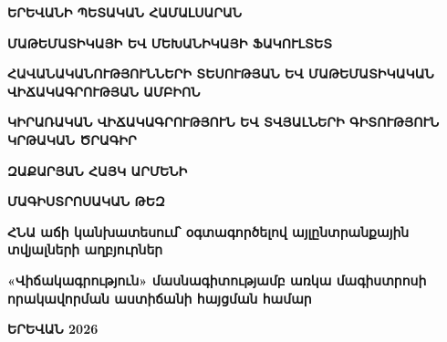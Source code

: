\documentclass[12pt,a4paper]{report}
\begin{document}
        \hypersetup{pageanchor=false}

        \begin{titlepage}
        \begin{center}
        {\armenianfrontfont\bfseries\Large \MakeUppercase{ԵՐԵՎԱՆԻ ՊԵՏԱԿԱՆ ՀԱՄԱԼՍԱՐԱՆ}\par}
        \vspace{0.6cm}
        {\armenianfrontfont\bfseries\Large \MakeUppercase{ՄԱԹԵՄԱՏԻԿԱՅԻ ԵՎ ՄԵԽԱՆԻԿԱՅԻ ՖԱԿՈՒԼՏԵՏ}\par}
        \vspace{1.4cm}
        {\armenianfrontfont\bfseries\Large ՀԱՎԱՆԱԿԱՆՈՒԹՅՈՒՆՆԵՐԻ ՏԵՍՈՒԹՅԱՆ ԵՎ ՄԱԹԵՄԱՏԻԿԱԿԱՆ ՎԻՃԱԿԱԳՐՈՒԹՅԱՆ ԱՄԲԻՈՆ\par}
        \vspace{1.8cm}
        {\armenianfrontfont\bfseries\Large \MakeUppercase{ԿԻՐԱՌԱԿԱՆ ՎԻՃԱԿԱԳՐՈՒԹՅՈՒՆ ԵՎ ՏՎՅԱԼՆԵՐԻ ԳԻՏՈՒԹՅՈՒՆ ԿՐԹԱԿԱՆ ԾՐԱԳԻՐ}\par}
        \vspace{2.1cm}
        {\armenianfrontfont\bfseries\Large ԶԱՔԱՐՅԱՆ ՀԱՅԿ ԱՐՄԵՆԻ\par}
        \vspace{1.5cm}
        {\armenianfrontfont\bfseries\LARGE ՄԱԳԻՍՏՐՈՍԱԿԱՆ ԹԵԶ\par}
        \vspace{1.5cm}
        {\armenianfrontfont\bfseries\Large ՀՆԱ աճի կանխատեսում՝ օգտագործելով այլընտրանքային տվյալների աղբյուրներ\par}
        \vspace{1.4cm}
        {\armenianfrontfont\bfseries\large «Վիճակագրություն» մասնագիտությամբ առկա մագիստրոսի որակավորման աստիճանի հայցման համար\par}
        \vfill
        {\armenianfrontfont\bfseries\Large ԵՐԵՎԱՆ 2026\par}
        \end{center}
        \end{titlepage}
\end{document}
